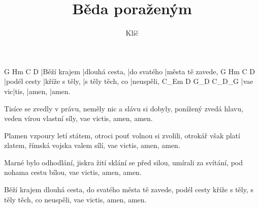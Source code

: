 \documentclass{song}
\title{Běda poraženým}
\author{Klíč}
\begin{document}
\strophe
G            Hm             C           D
|Běží krajem |dlouhá cesta, |do svatého |města tě zavede,
G            Hm             C                D
|podél cesty |kříže s těly, |s těly těch, co |neuspěli,
C_Em    D     G_D    C_D_G
|vae vic|tis, |amen, |amen.
\endstrophe

\strophe*
Tisíce se zvedly v právu, neměly nic a slávu si dobyly,
ponížený zvedá hlavu, veden vírou vlastní síly,
vae victis, amen, amen.
\endstrophe

\strophe*
Plamen vzpoury letí státem, otroci pouť volnou si zvolili,
otrokář však platí zlatem, římská vojska valem sílí,
vae victis, amen, amen.
\endstrophe

\strophe*
Marné bylo odhodlání, jiskra žití sklání se před silou,
umírali za svítání, pod nohama cestu bílou,
vae victis, amen, amen.
\endstrophe

\strophe*
Běží krajem dlouhá cesta, do svatého města tě zavede,
podél cesty kříže s těly, s těly těch, co neuspěli,
vae victis, amen, amen.
\endstrophe
\end{document}
